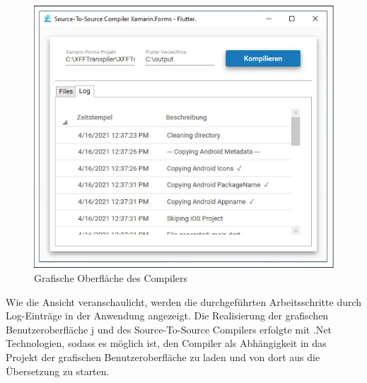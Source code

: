 \begin{figure}[!ht]
 \includegraphics[width=\textwidth,keepaspectratio]{Images/Implementation/UiScreenshot.png}
 \caption{Grafische Oberfläche des Compilers}
 \label{fig:CompilerUI}
\end{figure}

Wie die Ansicht veranschaulicht, werden die durchgeführten Arbeitsschritte durch Log-Einträge in der Anwendung angezeigt.
Die Realisierung der grafischen Benutzeroberfläche j
und des Source-To-Source Compilers erfolgte mit  .Net Technologien,  sodass es möglich ist,  den Compiler als Abhängigkeit in das Projekt der grafischen Benutzeroberfläche zu laden und von dort aus die Übersetzung zu starten.  


